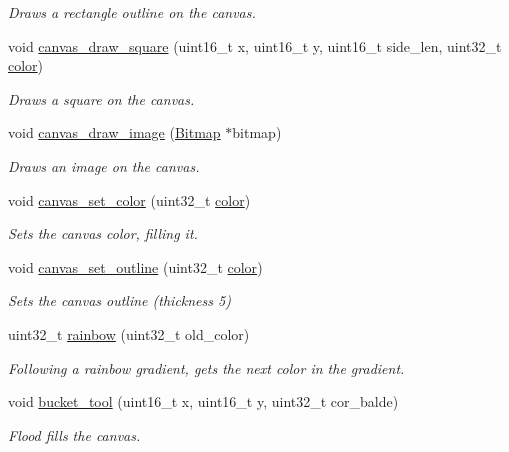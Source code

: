 \begin{DoxyCompactItemize}
\begin{DoxyCompactList}\small\item\em Draws a rectangle outline on the canvas. \end{DoxyCompactList}\item 
void \mbox{\hyperlink{group__canvas_gaa3c801c4663518591f899050db47ad0b}{canvas\+\_\+draw\+\_\+square}} (uint16\+\_\+t x, uint16\+\_\+t y, uint16\+\_\+t side\+\_\+len, uint32\+\_\+t \mbox{\hyperlink{structcolor}{color}})
\begin{DoxyCompactList}\small\item\em Draws a square on the canvas. \end{DoxyCompactList}\item 
void \mbox{\hyperlink{group__canvas_ga303719676550209a9abd9ca6554632ae}{canvas\+\_\+draw\+\_\+image}} (\mbox{\hyperlink{struct_bitmap}{Bitmap}} $\ast$bitmap)
\begin{DoxyCompactList}\small\item\em Draws an image on the canvas. \end{DoxyCompactList}\item 
void \mbox{\hyperlink{group__canvas_ga82c276340112469fe11a819ade81ead2}{canvas\+\_\+set\+\_\+color}} (uint32\+\_\+t \mbox{\hyperlink{structcolor}{color}})
\begin{DoxyCompactList}\small\item\em Sets the canvas color, filling it. \end{DoxyCompactList}\item 
void \mbox{\hyperlink{group__canvas_ga042599a460db7bc889fdf51cb56ae732}{canvas\+\_\+set\+\_\+outline}} (uint32\+\_\+t \mbox{\hyperlink{structcolor}{color}})
\begin{DoxyCompactList}\small\item\em Sets the canvas outline (thickness 5) \end{DoxyCompactList}\item 
uint32\+\_\+t \mbox{\hyperlink{group__canvas_ga4bac68c651bfc3551d7f9fbbdf7d0e18}{rainbow}} (uint32\+\_\+t old\+\_\+color)
\begin{DoxyCompactList}\small\item\em Following a rainbow gradient, gets the next color in the gradient. \end{DoxyCompactList}\item 
void \mbox{\hyperlink{group__canvas_ga40081f7d018fdf95112d5171175fc30c}{bucket\+\_\+tool}} (uint16\+\_\+t x, uint16\+\_\+t y, uint32\+\_\+t cor\+\_\+balde)
\begin{DoxyCompactList}\small\item\em Flood fills the canvas. \end{DoxyCompactList}\item 

\end{DoxyCompactItemize}
